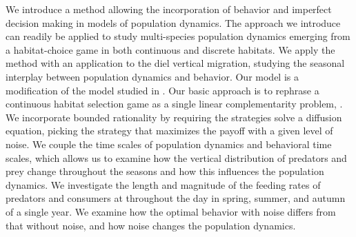 We introduce a method allowing the incorporation of behavior and imperfect decision making in models of population dynamics. The approach we introduce can readily be applied to study multi-species population dynamics emerging from a habitat-choice game in both continuous and discrete habitats. We apply the method with an application to the diel vertical migration, studying the seasonal interplay between population dynamics and behavior. Our model is a modification of the model studied in \citep{verticalmigration}. Our basic approach is to rephrase a continuous habitat selection game as a single linear complementarity problem, \citep{miller1991copositive}. We incorporate bounded rationality by requiring the strategies solve a diffusion equation, picking the strategy that maximizes the payoff with a given level of noise.
We couple the time scales of population dynamics and behavioral time scales, which allows us to examine how the vertical distribution of predators and prey change throughout the seasons and how this influences the population dynamics. We investigate the length and magnitude of the feeding rates of predators and consumers at throughout the day in spring, summer, and autumn of a single year. We examine how the optimal behavior with noise differs from that without noise, and how noise changes the population dynamics.

